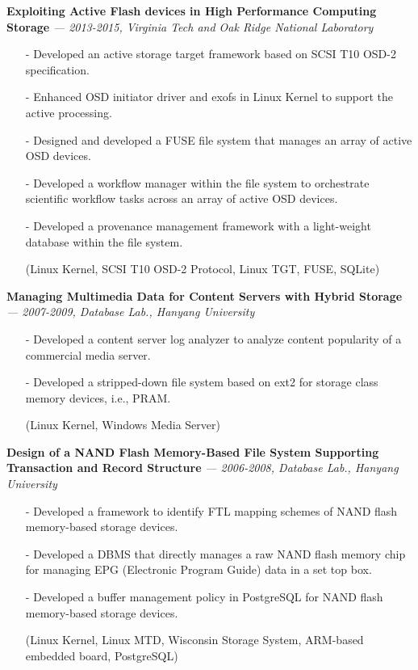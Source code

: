   \vspace{-0.15in}
  {\bf Exploiting Active Flash devices in High Performance Computing Storage}
    {\it \footnotesize --- 2013-2015, Virginia Tech and Oak Ridge National Laboratory}
    \begin{itemize}[leftmargin=*]
    \setlength\itemsep{-0.02in}
    \item[-] Developed an active storage target framework based on SCSI T10 OSD-2
    specification.
    \item[-] Enhanced OSD initiator driver and exofs in Linux Kernel to support the active
    processing.
    \item[-] Designed and developed a FUSE file system that manages an array of active OSD devices.
    \item[-] Developed a workflow manager within the file system to orchestrate scientific
    workflow tasks across an array of active OSD devices.
    \item[-] Developed a provenance management framework with a light-weight database
             within the file system.
    \item[] {\small(Linux Kernel, SCSI T10 OSD-2 Protocol, Linux TGT, FUSE, SQLite)}
    \end{itemize}
  \vspace{-0.15in}
  {\bf Managing Multimedia Data for Content Servers with Hybrid Storage}
    {\it \footnotesize --- 2007-2009, Database Lab., Hanyang University}
    \begin{itemize}[leftmargin=*]
    \setlength\itemsep{-0.02in}
    \item[-] Developed a content server log analyzer to analyze content popularity
             of a commercial media server.
    \item[-] Developed a stripped-down file system based on ext2
             for storage class memory devices, i.e., PRAM.
    \item[] {\small(Linux Kernel, Windows Media Server)}
    \end{itemize}
  \vspace{-0.15in}
  {\bf Design of a NAND Flash Memory-Based File System Supporting Transaction and
      Record Structure} 
    {\it \footnotesize --- 2006-2008, Database Lab., Hanyang University}
    \begin{itemize}[leftmargin=*]
    \setlength\itemsep{-0.02in}
    \item[-] Developed a framework to identify FTL mapping schemes of NAND flash memory-based
             storage devices.
    \item[-] Developed a DBMS that directly manages a raw NAND flash memory chip
             for managing EPG (Electronic Program Guide) data in a set top box.
    \item[-] Developed a buffer management policy in PostgreSQL for NAND flash
             memory-based storage devices.
    \item[] {\small(Linux Kernel, Linux MTD, Wisconsin Storage System, ARM-based embedded
     board, PostgreSQL)}
    \end{itemize}
